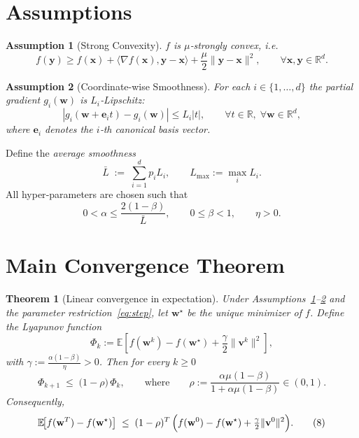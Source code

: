 \documentclass[11pt]{article}
\newtheorem{theorem}{Theorem}
\newtheorem{assumption}{Assumption}
\newcommand{\E}{\mathbb{E}}
\newcommand{\R}{\mathbb{R}}
\begin{document}
\section*{Assumptions}
\begin{assumption}[Strong Convexity]\label{as:strong}
$f$ is $\mu$‑strongly convex, i.e.
\[
f(\mathbf y)\ge f(\mathbf x)+\langle \nabla f(\mathbf x),\mathbf y-\mathbf x\rangle
+\frac{\mu}{2}\|\mathbf y-\mathbf x\|^{2},\qquad\forall\mathbf x,\mathbf y\in\R^{d}.
\tag{2}
\]
\end{assumption}
\begin{assumption}[Coordinate-wise Smoothness]\label{as:smooth}
For each $i\in\{1,\dots,d\}$ the partial gradient $g_i(\mathbf w)$ is $L_i$‑Lipschitz:
\[
|g_i(\mathbf w+\mathbf e_i t)-g_i(\mathbf w)|\le L_i|t|,\qquad \forall t\in\R,\;\forall\mathbf w\in\R^{d},
\tag{3}
\]
where $\mathbf e_i$ denotes the $i$‑th canonical basis vector.
\end{assumption}
Define the \emph{average smoothness}
\[
\bar L \;:=\; \sum_{i=1}^{d}p_iL_i,\qquad
L_{\max}:=\max_{i}L_i .
\tag{4}
\]
All hyper‑parameters are chosen such that
\[
0<\alpha\le \frac{2(1-\beta)}{\bar L},\qquad 0\le\beta<1,\qquad \eta>0 .
\tag{5}
\]

\section*{Main Convergence Theorem}
\begin{theorem}[Linear convergence in expectation]\label{thm:linear}
Under Assumptions~\ref{as:strong}–\ref{as:smooth} and the parameter
restriction~\eqref{eq:step}, let $\mathbf w^{\star}$ be the unique minimizer of $f$.
Define the Lyapunov function
\[
\Phi_k:=\E\!\left[f(\mathbf w^{k})-f(\mathbf w^{\star})+\frac{\gamma}{2}\|\mathbf v^{k}\|^{2}\right],
\tag{6}
\]
with $\gamma:=\frac{\alpha(1-\beta)}{\eta}>0$.
Then for every $k\ge0$
\[
\Phi_{k+1}\;\le\;\bigl(1-\rho\bigr)\,\Phi_{k},
\qquad\text{where}\qquad
\rho:=\frac{\alpha\mu(1-\beta)}{1+\alpha\mu(1-\beta)}\in(0,1).
\tag{7}
\]
Consequently,
\[
\E\!\bigl[f(\mathbf w^{T})-f(\mathbf w^{\star})\bigr]\;\le\;(1-\rho)^{T}\,
\Bigl(f(\mathbf w^{0})-f(\mathbf w^{\star})+\tfrac{\gamma}{2}\|\mathbf v^{0}\|^{2}\Bigr).
\tag{8}
\]
\end{theorem}
\end{document}
